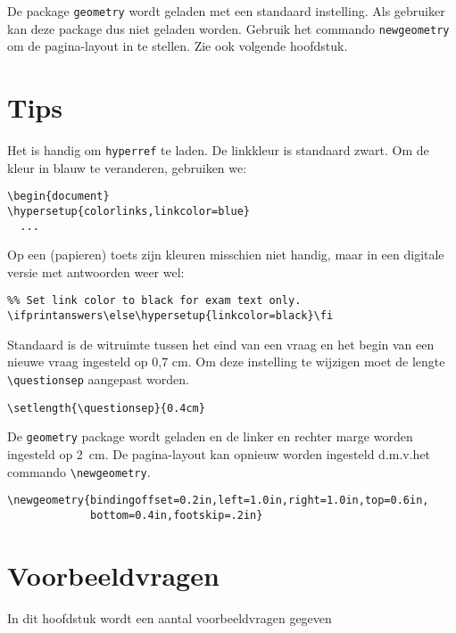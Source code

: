 \documentclass[12pt,dutch,addpoints,fleqn]{tisdexam}
\begin{document}
De package \verb|geometry| wordt geladen met een standaard instelling. Als
gebruiker kan deze package dus niet geladen worden. Gebruik het commando
\verb|newgeometry| om de pagina-layout in te stellen. Zie ook volgende
hoofdstuk.


\section{Tips}
Het is handig om \verb|hyperref| te laden. De linkkleur is standaard zwart.
Om de kleur in blauw te veranderen, gebruiken we:

\begin{lstlisting}
\begin{document}
\hypersetup{colorlinks,linkcolor=blue}
  ...
\end{lstlisting}

Op een (papieren) toets zijn kleuren misschien niet handig, maar in een
digitale versie met antwoorden weer wel:

\begin{lstlisting}
%% Set link color to black for exam text only.
\ifprintanswers\else\hypersetup{linkcolor=black}\fi
\end{lstlisting}


Standaard is de witruimte tussen het eind van een vraag en het begin van een
nieuwe vraag ingesteld op 0,7 cm. Om deze instelling te wijzigen moet de
lengte \verb|\questionsep| aangepast worden.

\begin{lstlisting}
\setlength{\questionsep}{0.4cm}
\end{lstlisting}


De \verb|geometry| package wordt geladen en de linker en rechter marge worden
ingesteld op 2~cm. De pagina-layout kan opnieuw worden ingesteld
d.m.v.\@ het commando \verb|\newgeometry|.

\begin{lstlisting}
\newgeometry{bindingoffset=0.2in,left=1.0in,right=1.0in,top=0.6in,
             bottom=0.4in,footskip=.2in}
\end{lstlisting}

\section{Voorbeeldvragen}
In dit hoofdstuk wordt een aantal voorbeeldvragen gegeven
\end{document}
